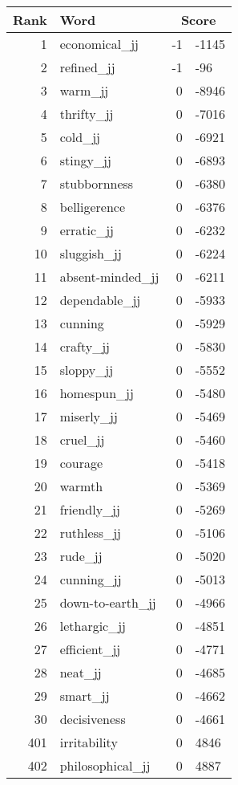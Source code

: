 \begin{longtable}[!htbp]{| rlr@{.}l |}
    \hline
    \textbf{Rank} & \textbf{Word} & \multicolumn{2}{c|}{\textbf{Score}} \\
    \hline
    \endhead
    1 & economical\_jj & -1 & -1145 \\
    2 & refined\_jj & -1 & -96 \\
    3 & warm\_jj & 0 & -8946 \\
    4 & thrifty\_jj & 0 & -7016 \\
    5 & cold\_jj & 0 & -6921 \\
    6 & stingy\_jj & 0 & -6893 \\
    7 & stubbornness & 0 & -6380 \\
    8 & belligerence & 0 & -6376 \\
    9 & erratic\_jj & 0 & -6232 \\
    10 & sluggish\_jj & 0 & -6224 \\
    11 & absent-minded\_jj & 0 & -6211 \\
    12 & dependable\_jj & 0 & -5933 \\
    13 & cunning & 0 & -5929 \\
    14 & crafty\_jj & 0 & -5830 \\
    15 & sloppy\_jj & 0 & -5552 \\
    16 & homespun\_jj & 0 & -5480 \\
    17 & miserly\_jj & 0 & -5469 \\
    18 & cruel\_jj & 0 & -5460 \\
    19 & courage & 0 & -5418 \\
    20 & warmth & 0 & -5369 \\
    21 & friendly\_jj & 0 & -5269 \\
    22 & ruthless\_jj & 0 & -5106 \\
    23 & rude\_jj & 0 & -5020 \\
    24 & cunning\_jj & 0 & -5013 \\
    25 & down-to-earth\_jj & 0 & -4966 \\
    26 & lethargic\_jj & 0 & -4851 \\
    27 & efficient\_jj & 0 & -4771 \\
    28 & neat\_jj & 0 & -4685 \\
    29 & smart\_jj & 0 & -4662 \\
    30 & decisiveness & 0 & -4661 \\
    401 & irritability & 0 & 4846 \\
    402 & philosophical\_jj & 0 & 4887 \\

\end{longtable}
